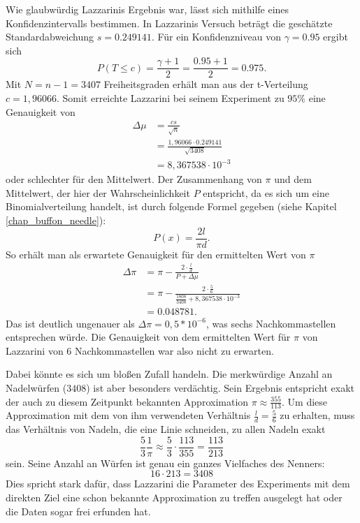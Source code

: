 \documentclass[10pt,twocolumn]{scrartcl}
\begin{document}
	Wie glaubwürdig Lazzarinis Ergebnis war, lässt sich mithilfe eines Konfidenzintervalls bestimmen.
	In Lazzarinis Versuch beträgt die geschätzte Standardabweichung $s = 0.249141$.
	Für ein Konfidenzniveau von $\gamma = 0.95$ ergibt sich
	\begin{equation}
	P(T \le c) = \frac{\gamma + 1}{2} = \frac{0.95 + 1}{2} = 0.975 .
	\end{equation}
	Mit $N = n - 1 = 3407$ Freiheitsgraden erhält man aus der t-Verteilung $c = 1,96066$.
	Somit erreichte Lazzarini bei seinem Experiment zu $95\%$ eine Genauigkeit von
	\begin{align}
	\Delta \mu &= \frac{cs}{\sqrt{n}} \\
	&= \frac{1,96066 \cdot 0.249141}{\sqrt{3408}} \nonumber \\
	&= 8,367538 \cdot 10 ^{-3} \nonumber
	\end{align}
	oder schlechter für den Mittelwert. Der Zusammenhang von $\pi$ und dem Mittelwert, der hier der Wahrscheinlichkeit $P$ entspricht, da es sich um eine Binomialverteilung handelt, ist durch folgende Formel gegeben (siehe Kapitel \ref{chap_buffon_needle}):
	\begin{equation}
	P(x) = \frac{2l}{\pi d}.
	\end{equation}
	So erhält man als erwartete Genauigkeit für den ermittelten Wert von $\pi$
	\begin{align}
	\Delta \pi &= \pi - \frac{2 \cdot \frac{l}{d}}{P + \Delta \mu} \\
	&= \pi - \frac{2 \cdot \frac{5}{6}}{\frac{1808}{3408} + 8,367538 \cdot 10 ^{-3}} \nonumber \\
	&= 0.048781 \nonumber .
	\end{align}
	Das ist deutlich ungenauer als $\Delta \pi = 0,5 * 10^{-6}$, was sechs Nachkommastellen entsprechen würde.
	Die Genauigkeit von dem ermittelten Wert für $\pi$ von Lazzarini von 6 Nachkommastellen war also nicht zu erwarten.
	
	Dabei könnte es sich um bloßen Zufall handeln. Die merkwürdige Anzahl an Nadelwürfen ($3408$) ist aber besonders verdächtig. Sein Ergebnis entspricht exakt der auch zu diesem Zeitpunkt bekannten Approximation $\pi \approx \frac{355}{113}$.
	Um diese Approximation mit dem von ihm verwendeten Verhältnis ${\tfrac {l}{d}={\tfrac {5}{6}}}$ zu erhalten, muss das Verhältnis von Nadeln, die eine Linie schneiden, zu allen Nadeln exakt
	\begin{equation}
	\frac{5}{3} \frac{1}{\pi}  \approx \frac{5}{3} \cdot \frac{113}{355} = \frac{113}{213}
	\end{equation}
	sein.
	Seine Anzahl an Würfen ist genau ein ganzes Vielfaches des Nenners:
	\begin{equation}
	16 \cdot 213 = 3408
	\end{equation}
	Dies spricht stark dafür, dass Lazzarini die Parameter des Experiments mit dem direkten Ziel eine schon bekannte Approximation zu treffen ausgelegt hat oder die Daten sogar frei erfunden hat. \cite{Badger}
	
\end{document}

